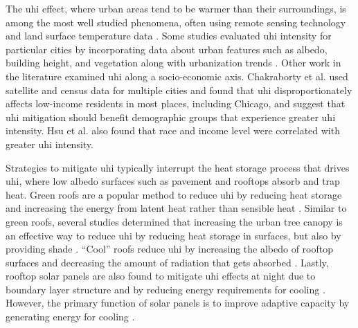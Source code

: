 The \ac{uhi} effect, where urban areas tend to be warmer than their surroundings,
is among the most well studied phenomena, often using remote sensing technology and land
surface temperature data \cite{almeida_study_2021, cotlier_extreme_2022}.
Some studies evaluated \ac{uhi} intensity for particular cities by incorporating
data about urban features such as albedo, building height, and vegetation
\cite{sangiorgio_development_2020,abulibdeh_analysis_2021} along with urbanization
trends \cite{li_how_2021}. Other work in the literature examined \ac{uhi} along
a socio-economic axis. Chakraborty et al. \cite{chakraborty_disproportionately_2019}
used satellite and census data for multiple cities and found that \ac{uhi}
disproportionately affects low-income residents in most places, including Chicago,
and suggest that \ac{uhi} mitigation should benefit demographic groups that experience
greater \ac{uhi} intensity. Hsu et al. \cite{hsu_disproportionate_2021} also
found that race and income level were correlated with greater \ac{uhi} intensity.

Strategies to mitigate \ac{uhi} typically interrupt the heat storage process that
drives \ac{uhi}, where
low albedo surfaces such as pavement and rooftops absorb and trap heat. Green roofs
are a popular method to reduce \ac{uhi} by reducing heat storage and increasing
the energy from latent heat rather than sensible heat \cite{zhang_effectiveness_2017}.
Similar to green roofs, several studies determined that increasing the urban
tree canopy is an effective way to reduce \ac{uhi} by reducing heat storage in
surfaces, but also by providing shade \cite{middel_urban_2015,
loughner_roles_2012, mcdonald_tree_2021, marando_urban_2022, schwaab_role_2021}.
``Cool'' roofs reduce \ac{uhi} by increasing the albedo of rooftop surfaces and
decreasing the amount of radiation that gets absorbed \cite{zhang_effectiveness_2017,
salamanca_citywide_2016, middel_urban_2015}. Lastly, rooftop solar panels are also
found to mitigate \ac{uhi} effects at night due to boundary
layer structure and by reducing energy requirements for cooling \cite{masson_solar_2014,
sailor_photovoltaics_2021, salamanca_citywide_2016}. However, the primary
function of solar panels is to improve adaptive capacity by generating energy
for cooling \cite{masson_solar_2014}.

